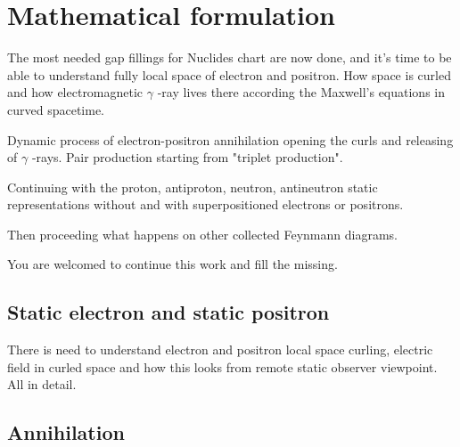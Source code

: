 %
%
%
\begin{comment}\end{comment}
\chapter{Mathematical formulation}

The most needed gap fillings for Nuclides chart\cite{Nuclides} are now done,
and it's time to be able to understand fully local space of electron and
positron. How space is curled and how electromagnetic $\gamma$ -ray lives
there according the Maxwell's equations in curved
spacetime\cite{MaxwellsEquations}.

Dynamic process of electron-positron annihilation\cite{Annihilation}
opening the curls and releasing of $\gamma$ -rays. Pair
production\cite{PairProduction} starting from "triplet production".

Continuing with the proton, antiproton, neutron, antineutron static
representations without and with superpositioned electrons or positrons.

Then proceeding what happens on other collected Feynmann
diagrams\cite{FeynmannDiagram}.

You are welcomed to continue this work and fill the missing.

\section{Static electron and static positron}
\label{electron_positron}

There is need to understand electron and positron local space curling,
electric field in curled space and how this looks from remote static
observer viewpoint. All in detail.

\section{Annihilation}
\label{annihilation}

